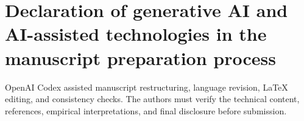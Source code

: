 \documentclass[final,5p,times,number]{elsarticle}
\begin{document}
\section*{Declaration of generative AI and AI-assisted technologies in the manuscript preparation process}
OpenAI Codex assisted manuscript restructuring, language revision, LaTeX editing, and consistency checks. The authors must verify the technical content, references, empirical interpretations, and final disclosure before submission.
\FloatBarrier


\end{document}
